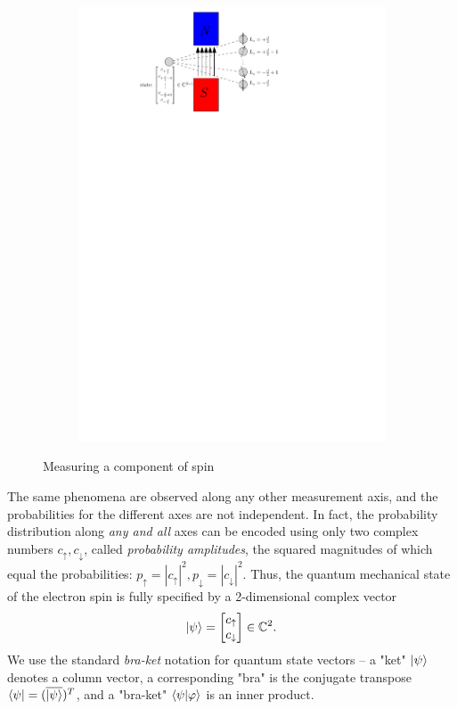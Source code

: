 \documentclass[12pt,final,3p]{elsarticle}
\begin{document}
\begin{figure}[h]
\begin{subfigure}{0.48\textwidth}
		\includegraphics[width=\textwidth, keepaspectratio]{figures/spin_anim_08.pdf}
		\label{fig:spind2}
	\end{subfigure}
	\caption{Measuring a component of spin}
\end{figure}

The same phenomena are observed along any other measurement axis, and the probabilities for the different axes are not independent. In fact, the probability distribution along \emph{any and all} axes can be encoded using only two complex numbers $c_{\uparrow}, c_{\downarrow}$, called \emph{probability amplitudes}, the squared magnitudes of which equal the probabilities: $p_{\uparrow} = \left| c_{\uparrow} \right|^{2}, p_{\downarrow} = \left| c_{\downarrow} \right|^{2}$. Thus, the quantum mechanical state of the electron spin is fully specified by a 2-dimensional complex vector
\begin{align}
\ket{\psi} = \begin{bmatrix}
c_{\uparrow} \\
c_{\downarrow}
\end{bmatrix} \in \mathbb{C}^{2}.
\end{align}
We use the standard \emph{bra-ket} notation for quantum state vectors -- a "ket" $\ket{\psi}$ denotes a column vector, a corresponding "bra" is the conjugate transpose $\bra{\psi} = (\overline{\ket{\psi}})^{T}$, and a "bra-ket" $\braket{\psi|\varphi}$ is an inner product.
\end{document}
